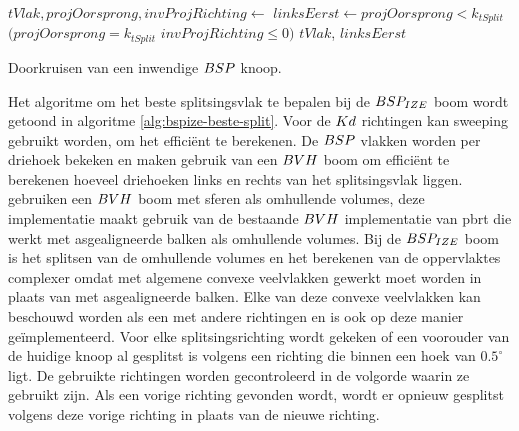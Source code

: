 \begin{dutchalgorithm}
    \begin{algorithmic}       
            \State $tVlak, projOorsprong, invProjRichting \gets $ 
            \State $linksEerst \gets projOorsprong < k_{tSplit}$ \Or $(projOorsprong = k_{tSplit}$ \And $invProjRichting \leq 0)$
            \State \Return $tVlak$, $linksEerst$
        \EndFunction
    \end{algorithmic}
    \caption{Doorkruisen van een inwendige $BSP$ knoop.}
    \label{alg:bsp-inwendige-doorkruising}
\end{dutchalgorithm}

Het algoritme om het beste splitsingsvlak te bepalen bij de $BSP_{IZE}$ boom wordt getoond in algoritme \ref{alg:bspize-beste-split}.
Voor de $Kd$ richtingen kan sweeping gebruikt worden, om het efficiënt te berekenen.
De $BSP$ vlakken worden per driehoek bekeken en maken gebruik van een $BVH$ boom om efficiënt te berekenen hoeveel driehoeken links en rechts van het splitsingsvlak liggen.
\authorIze{} \cite{ize} gebruiken een $BVH$ boom met sferen als omhullende volumes, deze implementatie maakt gebruik van de bestaande $BVH$ implementatie van pbrt die werkt met asgealigneerde balken als omhullende volumes.
Bij de $BSP_{IZE}$ boom is het splitsen van de omhullende volumes en het berekenen van de oppervlaktes complexer omdat met algemene convexe veelvlakken gewerkt moet worden in plaats van met asgealigneerde balken.
Elke van deze convexe veelvlakken kan beschouwd worden als een \symKDOP{} met andere richtingen en is ook op deze manier geïmplementeerd.
Voor elke splitsingsrichting wordt gekeken of een voorouder van de huidige knoop al gesplitst is volgens een richting die binnen een hoek van $0.5^{\circ}$ ligt. 
De gebruikte richtingen worden gecontroleerd in de volgorde waarin ze gebruikt zijn.
Als een vorige richting gevonden wordt, wordt er opnieuw gesplitst volgens deze vorige richting in plaats van de nieuwe richting.



